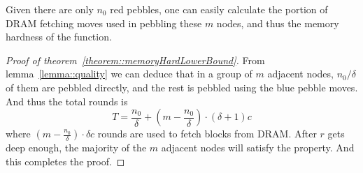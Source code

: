 Given there are only $n_0$ red pebbles, one can easily calculate the portion of DRAM fetching moves used in pebbling
these $m$ nodes, and thus the memory hardness of the function.

\begin{proof}[Proof of theorem~\ref{theorem::memoryHardLowerBound}]
  From lemma~\ref{lemma::quality} we can deduce that in a group of $m$ adjacent nodes, $n_0 / \delta$ of them are pebbled
  directly, and the rest is pebbled using the blue pebble moves. And thus the total rounds is
  \begin{equation}
    T = \frac{n_0}{\delta} + (m - \frac{n_0}{\delta}) \cdot (\delta + 1) c
  \end{equation}
  where $(m - \frac{n_0}{\delta}) \cdot \delta c$ rounds are used to fetch blocks from DRAM. After $r$ gets deep enough,
  the majority of the $m$ adjacent nodes will satisfy the property. And this completes the proof.
\end{proof}
